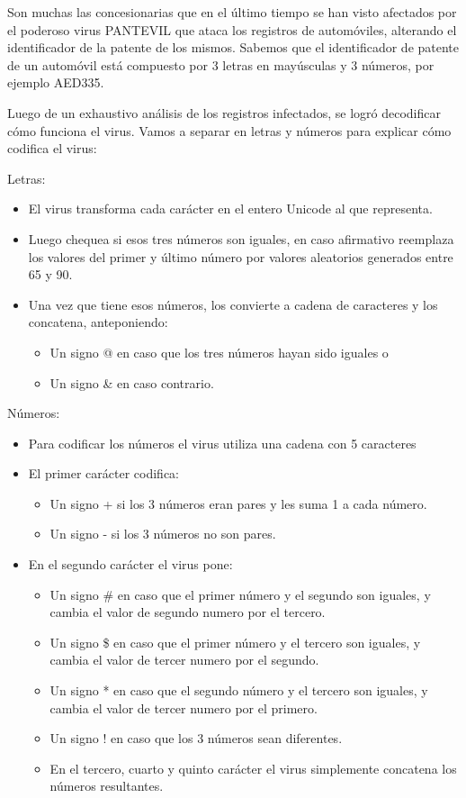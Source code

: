 Son muchas las concesionarias que en el último tiempo se han visto afectados por el poderoso virus PANTEVIL que ataca los registros de automóviles, alterando el identificador de la patente de los mismos. Sabemos que el identificador de patente de un automóvil está compuesto por 3 letras en mayúsculas y 3 números, por ejemplo AED335.

Luego de un exhaustivo análisis de los registros infectados, se logró decodificar cómo funciona el virus. Vamos a separar en letras y números para explicar cómo codifica el virus:

Letras:
\begin{itemize}
	\item El virus transforma cada carácter en el entero Unicode al que representa.
	\item Luego chequea si esos tres números son iguales, en caso afirmativo reemplaza los valores del primer y último número por valores aleatorios generados entre 65 y 90.
	\item Una vez que tiene esos números, los convierte a cadena de caracteres y los concatena, anteponiendo:
	\begin{itemize}
		\item Un signo @ en caso que los tres números hayan sido iguales o
		\item Un signo \& en caso contrario.	
	\end{itemize}
	
\end{itemize}
Números:

\begin{itemize}
	\item Para codificar los números el virus utiliza una cadena con 5 caracteres
	\item El primer carácter codifica:
	\begin{itemize}
		\item Un signo + si los 3 números eran pares y les suma 1 a cada número.
		\item Un signo - si los 3 números no son pares.
	\end{itemize}
	\item En el segundo carácter el virus pone:
	\begin{itemize}
		\item Un signo \# en caso que el primer número y el segundo son iguales, y cambia el valor de segundo numero por el tercero.
		\item Un signo \$ en caso que el primer número y el tercero son iguales, y cambia el valor de tercer numero por el segundo.
		\item Un signo * en caso que el segundo número y el tercero son iguales, y cambia el valor de tercer numero por el primero.
		\item Un signo ! en caso que los 3 números sean diferentes.
		\item En el tercero, cuarto y quinto carácter el virus simplemente concatena los números resultantes.
	\end{itemize}
\end{itemize}

